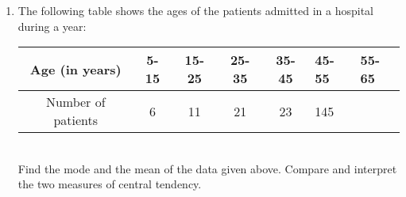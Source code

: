 \renewcommand{\theequation}{\theenumi}
\begin{enumerate}[label=\arabic*.,ref=\thesubsection.\theenumi]
	\item The following table shows the ages of the patients admitted in a hospital during a year:
	\begin{tabular}{|c|c|c|c|c|}
	\hline
	Age (in years) &5-15&15-25&25-35&35-45&45-55&55-65\\
	\hline
	Number of patients&6&11&21&23&145\\
	\hline
	\end{tabular}\\
	Find the mode and the mean of the data given above. Compare and interpret the two
	measures of central tendency.
\end{enumerate}